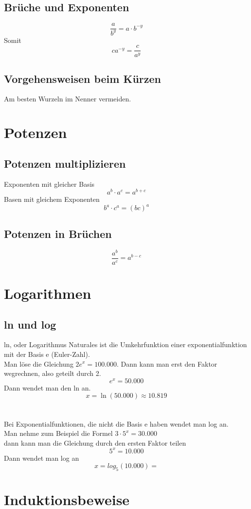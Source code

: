\documentclass[11pt, a4paper]{article}
\begin{document}
\subsection{Brüche und Exponenten}
\[
	\frac{a}{b^{y}} = a \cdot b^{-y}
\]
Somit
\[
	ca^{-y} = \frac{c}{a^{y}}
\]

\subsection{Vorgehensweisen beim Kürzen}
Am besten Wurzeln im Nenner vermeiden.\\
\section{Potenzen}
\subsection{Potenzen multiplizieren}
Exponenten mit gleicher Basis
\[a^{b} \cdot a^{c} = a^{b + c}\]
Basen mit gleichem Exponenten
\[b^{a} \cdot c^{a} = (bc)^{a}\]
\subsection{Potenzen in Brüchen}
\[\frac{a^{b}}{a^{c}} = a^{b-c}\]

\section{Logarithmen}
\subsection{ln und log}
ln, oder Logarithmus Naturales ist die Umkehrfunktion einer exponentialfunktion mit der Basis e (Euler-Zahl).\\Man löse die Gleichung $2e^{x}=100.000$.
Dann kann man erst den Faktor wegrechnen, also geteilt durch 2.
\[e^{x} = 50.000\]
Dann wendet man den ln an.
\[x = \ln{(50.000)} \approx 10.819\]
\\\\Bei Exponentialfunktionen, die nicht die Basis e haben wendet man log an.\\Man nehme zum Beispiel die Formel $3 \cdot 5^{x} = 30.000$\\
dann kann man die Gleichung durch den ersten Faktor teilen
\[5^{x}=10.000\]
Dann wendet man log an
\[x = log_5{(10.000)} = \]

\section{Induktionsbeweise}
\end{document}

